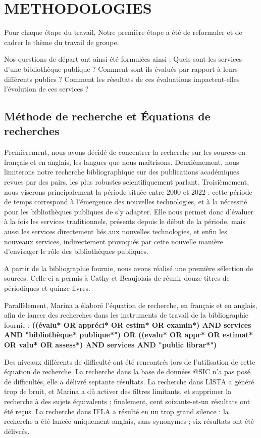 \documentclass[french,a4paper,12pt]{article}
\begin{document}
\newpage
\section{METHODOLOGIES}
Pour chaque étape du travail,  
Notre première étape a été de reformuler et de cadrer le thème du travail de groupe. 

\quad Nos questions de départ ont ainsi été formulées ainsi : Quels sont les services d'une bibliothèque publique ? Comment sont-ils évalués par rapport à leurs différents publics ? Comment les résultats de ces évaluations impactent-elles l'évolution de ces services ?\\
 
\subsection{Méthode de recherche​ et Équations de recherches}
\quad Premièrement, nous avons décidé de concentrer la recherche sur les sources en français et en anglais, les langues que nous maîtrisons. Deuxièmement, nous limiterons notre recherche bibliographique sur des publications académiques revues par des pairs, les plus robustes scientifiquement parlant. Troisièmement, nous viserons principalement la période située entre 2000 et 2022 : cette période de temps correspond à l’émergence des nouvelles technologies, et à la nécessité pour les bibliothèques publiques de s’y adapter. Elle nous permet donc d’évaluer à la fois les services traditionnels, présents depuis le début de la période, mais aussi les services directement liés aux nouvelles technologies, et enfin les nouveaux services, indirectement provoqués par cette nouvelle manière d'envisager le rôle des bibliothèques publiques. 

A partir de la bibliographie fournie, nous avons réalisé une première sélection de sources. Celle-ci a permis à Cathy et Beaujolais de réunir douze titres de périodiques et quinze livres. 

Parallèlement, Marina a élaboré l’équation de recherche, en français et en anglais, afin de lancer des recherches dans les instruments de travail de la bibliographie fournie :\textbf{ ((évalu* OR appréci* OR estim* OR examin*) AND services AND "bibliothèque* publique*") OR ((evalu* OR appr* OR estimat* OR valu* OR assess*) AND services AND "public librar*") }

Des niveaux différents de difficulté ont été rencontrés lors de l’utilisation de cette équation de recherche. La recherche dans la base de données @SIC n’a pas posé de difficultés, elle a délivré septante résultats. La recherche dans LISTA a généré trop de bruit, et Marina a dû activer des filtres limitants, et supprimer la recherche à des sujets équivalents ; finalement, cent soixante-et-un résultats ont été reçus. La recherche dans IFLA a résulté en un trop grand silence : la recherche a été lancée uniquement anglais, sans synonymes ; six résultats ont été délivrés.  
\end{document}
